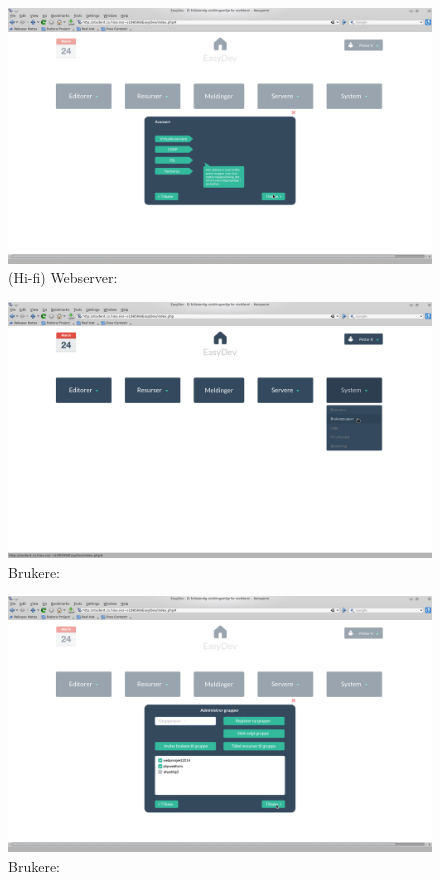 \begin{figure}[ht]
\includegraphics[width=\textwidth,height=\textheight,keepaspectratio]{./img/prosessdokumentasjon/hifi/a5.png}
\caption{(Hi-fi) Webserver:}
\label{fig:apachehi5}
\end{figure}

\begin{figure}[ht]
\includegraphics[width=\textwidth,height=\textheight,keepaspectratio]{./img/prosessdokumentasjon/hifi/b1.png}
\caption{Brukere: }
\label{fig:brukerehi1}
\end{figure}

\begin{figure}[ht]
\includegraphics[width=\textwidth,height=\textheight,keepaspectratio]{./img/prosessdokumentasjon/hifi/b2.png}
\caption{Brukere: }
\label{fig:brukerehi2}
\end{figure}

